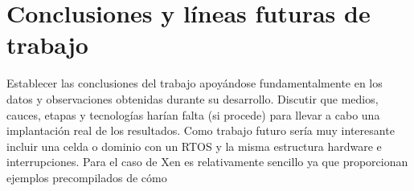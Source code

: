 \chapter{Conclusiones y líneas futuras de trabajo}

Establecer las conclusiones del trabajo apoyándose fundamentalmente en los datos y observaciones obtenidas durante su desarrollo. Discutir que medios, cauces, etapas y tecnologías harían falta (si procede) para llevar a cabo una implantación real de los resultados.
Como trabajo futuro sería muy interesante incluir una celda o dominio con un RTOS y la misma estructura hardware e interrupciones. Para el caso de Xen es relativamente sencillo ya que proporcionan ejemplos precompilados de cómo 
